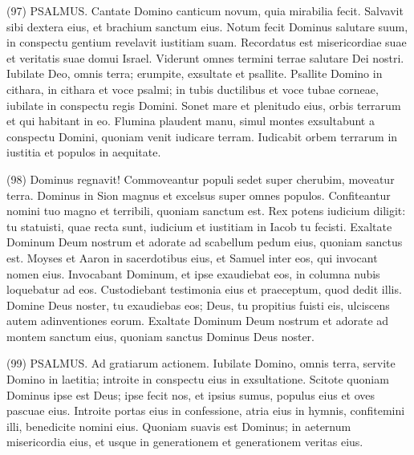 \begin{biblechapter}  (97) 
\verse PSALMUS. Cantate Domino canticum novum, quia mirabilia fecit. Salvavit sibi dextera eius, et brachium sanctum eius. 
\verse Notum fecit Dominus salutare suum, in conspectu gentium revelavit iustitiam suam. 
\verse Recordatus est misericordiae suae et veritatis suae domui Israel. Viderunt omnes termini terrae salutare Dei nostri. 
\verse Iubilate Deo, omnis terra; erumpite, exsultate et psallite. 
\verse Psallite Domino in cithara, in cithara et voce psalmi; 
\verse in tubis ductilibus et voce tubae corneae, iubilate in conspectu regis Domini. 
\verse Sonet mare et plenitudo eius, orbis terrarum et qui habitant in eo. 
\verse Flumina plaudent manu, simul montes exsultabunt 
\verse a conspectu Domini, quoniam venit iudicare terram. Iudicabit orbem terrarum in iustitia et populos in aequitate. 
\end{biblechapter}

\begin{biblechapter}  (98) 
\verse Dominus regnavit! Commoveantur populi sedet super cherubim, moveatur terra. 
\verse Dominus in Sion magnus et excelsus super omnes populos. 
\verse Confiteantur nomini tuo magno et terribili, quoniam sanctum est. 
\verse Rex potens iudicium diligit: tu statuisti, quae recta sunt, iudicium et iustitiam in Iacob tu fecisti. 
\verse Exaltate Dominum Deum nostrum et adorate ad scabellum pedum eius, quoniam sanctus est. 
\verse Moyses et Aaron in sacerdotibus eius, et Samuel inter eos, qui invocant nomen eius. Invocabant Dominum, et ipse exaudiebat eos, 
\verse in columna nubis loquebatur ad eos. Custodiebant testimonia eius et praeceptum, quod dedit illis. 
\verse Domine Deus noster, tu exaudiebas eos; Deus, tu propitius fuisti eis, ulciscens autem adinventiones eorum. 
\verse Exaltate Dominum Deum nostrum et adorate ad montem sanctum eius, quoniam sanctus Dominus Deus noster. 
\end{biblechapter}

\begin{biblechapter}  (99) 
\verse  PSALMUS. Ad gratiarum actionem. 
\verse Iubilate Domino, omnis terra, servite Domino in laetitia; introite in conspectu eius in exsultatione. 
\verse Scitote quoniam Dominus ipse est Deus; ipse fecit nos, et ipsius sumus, populus eius et oves pascuae eius. 
\verse Introite portas eius in confessione, atria eius in hymnis, confitemini illi, benedicite nomini eius. 
\verse Quoniam suavis est Dominus; in aeternum misericordia eius, et usque in generationem et generationem veritas eius. 
\end{biblechapter}

